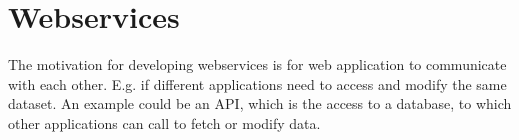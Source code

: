 \section{Webservices}
The motivation for developing webservices is for web application to communicate with each other. E.g. if different applications need to access and modify the same dataset. An example could be an API, which is the access to a database, to which other applications can call to fetch or modify data.